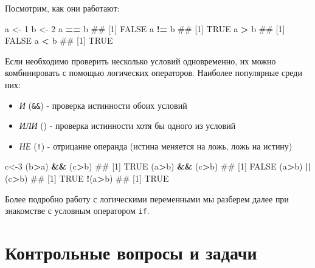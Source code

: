 \documentclass[]{book}
\newenvironment{Shaded}{\begin{snugshade}}{\end{snugshade}}
\newcommand{\DecValTok}[1]{\textcolor[rgb]{0.00,0.00,0.81}{#1}}
\newcommand{\StringTok}[1]{\textcolor[rgb]{0.31,0.60,0.02}{#1}}
\newcommand{\OperatorTok}[1]{\textcolor[rgb]{0.81,0.36,0.00}{\textbf{#1}}}
\newcommand{\NormalTok}[1]{#1}
\providecommand{\tightlist}{%
  \setlength{\itemsep}{0pt}\setlength{\parskip}{0pt}}
\begin{document}
Посмотрим, как они работают:

\begin{Shaded}
\begin{Highlighting}[]
\NormalTok{a <-}\StringTok{ }\DecValTok{1}
\NormalTok{b <-}\StringTok{ }\DecValTok{2}
\NormalTok{a }\OperatorTok{==}\StringTok{ }\NormalTok{b}
\NormalTok{## [1] FALSE}
\NormalTok{a }\OperatorTok{!=}\StringTok{ }\NormalTok{b}
\NormalTok{## [1] TRUE}
\NormalTok{a }\OperatorTok{>}\StringTok{ }\NormalTok{b}
\NormalTok{## [1] FALSE}
\NormalTok{a }\OperatorTok{<}\StringTok{ }\NormalTok{b}
\NormalTok{## [1] TRUE}
\end{Highlighting}
\end{Shaded}

Если необходимо проверить несколько условий одновременно, их можно
комбинировать с помощью логических операторов. Наиболее популярные среди
них:

\begin{itemize}
\tightlist
\item
  \emph{И} (\texttt{\&\&}) - проверка истинности обоих условий
\item
  \emph{ИЛИ} (\texttt{\textbar{}\textbar{}}) - проверка истинности хотя
  бы одного из условий
\item
  \emph{НЕ} (\texttt{!}) - отрицание операнда (истина меняется на ложь,
  ложь на истину)
\end{itemize}

\begin{Shaded}
\begin{Highlighting}[]
\NormalTok{c<-}\DecValTok{3}
\NormalTok{(b}\OperatorTok{>}\NormalTok{a) }\OperatorTok{&&}\StringTok{ }\NormalTok{(c}\OperatorTok{>}\NormalTok{b)}
\NormalTok{## [1] TRUE}
\NormalTok{(a}\OperatorTok{>}\NormalTok{b) }\OperatorTok{&&}\StringTok{ }\NormalTok{(c}\OperatorTok{>}\NormalTok{b)}
\NormalTok{## [1] FALSE}
\NormalTok{(a}\OperatorTok{>}\NormalTok{b) }\OperatorTok{||}\StringTok{ }\NormalTok{(c}\OperatorTok{>}\NormalTok{b)}
\NormalTok{## [1] TRUE}
\OperatorTok{!}\NormalTok{(a}\OperatorTok{>}\NormalTok{b)}
\NormalTok{## [1] TRUE}
\end{Highlighting}
\end{Shaded}

Более подробно работу с логическими переменными мы разберем далее при
знакомстве с условным оператором \texttt{if}.

\section{Контрольные вопросы и задачи}\label{questions_basics}
\end{document}
